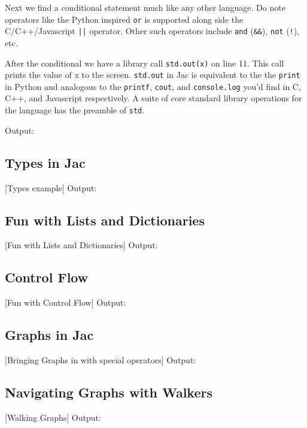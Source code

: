 \par
Next we find a conditional statement much like any other language. Do note operators like the Python inspired \texttt{or} is supported along side the C/C++/Javascript \texttt{||} operator. Other such operators include \texttt{and} (\texttt{\&\&}), \texttt{not} (\texttt{!}), etc.

\par
After the conditional we have a library call \texttt{std.out(x)} on line 11. This call prints the value of x to the screen. \texttt{std.out} in Jac is equivalent to the the \texttt{print} in Python and analogous to the \texttt{printf}, \texttt{cout}, and \texttt{console.log} you'd find in C, C++, and Javascript respectively. A suite of core standard library operations for the language has the preamble of \texttt{std}.

Output:


\subsection{Types in Jac}
[Types example]
Output:

\subsection{Fun with Lists and Dictionaries}
[Fun with Lists and Dictionaries]
Output:

\subsection{Control Flow}
[Fun with Control Flow]
Output:

\subsection{Graphs in Jac}
[Bringing Graphs in with special operators]
Output:

\subsection{Navigating Graphs with Walkers}
[Walking Graphs]
Output:

